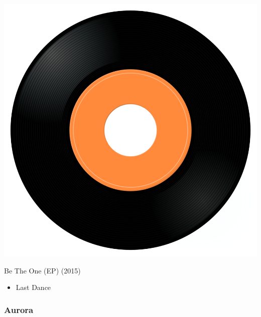 \begin{minipage}[t]{0.25\textwidth}\vspace{0pt}
\captionsetup{type=figure}
\includegraphics[width=\textwidth]{Images/cover.png}
\caption*{Be The One (EP) (2015)}
\end{minipage}
\begin{minipage}[t]{0.25\textwidth}\vspace{0pt}
\begin{itemize}[nosep,leftmargin=1em,labelwidth=*,align=left]
	\setlength{\itemsep}{0pt}
	\item Last Dance
\end{itemize}
\end{minipage}

\subsubsection{Aurora}

